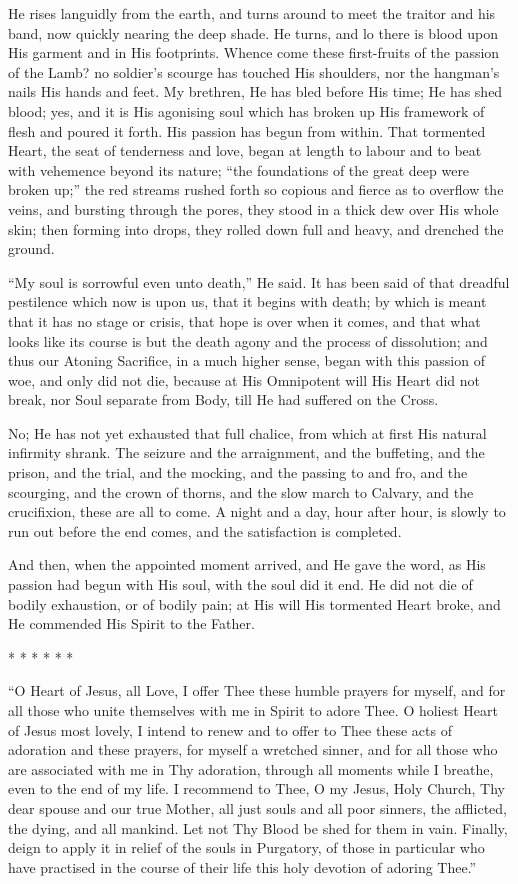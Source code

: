 He rises languidly from the earth, and turns around to meet the
traitor and his band, now quickly nearing the deep shade. He turns,
and lo there is blood upon His garment and in His footprints. Whence
come these first-fruits of the passion of the Lamb? no soldier's
scourge has touched His shoulders, nor the hangman's nails His hands
and feet. My brethren, He has bled before His time; He has shed blood;
yes, and it is His agonising soul which has broken up His framework of
flesh and poured it forth. His passion has begun from within. That
tormented Heart, the seat of tenderness and love, began at length to
labour and to beat with vehemence beyond its nature; ``the
foundations of the great deep were broken up;'' the red streams
rushed forth so copious and fierce as to overflow the veins, and
bursting through the pores, they stood in a thick dew over His whole
skin; then forming into drops, they rolled down full and heavy, and
drenched the ground.

``My soul is sorrowful even unto death,'' He said. It has
been said of that dreadful pestilence which now is upon us, that it
begins with death; by which is meant that it has no stage or crisis,
that hope is over when it comes, and that what looks like its course
is but the death agony and the process of dissolution; and thus our
Atoning Sacrifice, in a much higher sense, began with this passion of
woe, and only did not die, because at His Omnipotent will His Heart
did not break, nor Soul separate from Body, till He had suffered on
the Cross.

No; He has not yet exhausted that full chalice, from which at first
His natural infirmity shrank. The seizure and the arraignment, and the
buffeting, and the prison, and the trial, and the mocking, and the
passing to and fro, and the scourging, and the crown of thorns, and
the slow march to Calvary, and the crucifixion, these are all to come.
A night and a day, hour after hour, is slowly to run out before the
end comes, and the satisfaction is completed.

And then, when the appointed moment arrived, and He gave the word,
as His passion had begun with His soul, with the soul did it end. He
did not die of bodily exhaustion, or of bodily pain; at His will His
tormented Heart broke, and He commended His Spirit to the Father.

* *
* *
* *

``O Heart of Jesus, all Love, I offer Thee these humble prayers
for myself, and for all those who unite themselves with me in Spirit
to adore Thee. O holiest Heart of Jesus most lovely, I intend to renew
and to offer to Thee these acts of adoration and these prayers, for
myself a wretched sinner, and for all those who are associated with me
in Thy adoration, through all moments while I breathe, even to the end
of my life. I recommend to Thee, O my Jesus, Holy Church, Thy dear
spouse and our true Mother, all just souls and all poor sinners, the
afflicted, the dying, and all mankind. Let not Thy Blood be shed for
them in vain. Finally, deign to apply it in relief of the souls in
Purgatory, of those in particular who have practised in the course of
their life this holy devotion of adoring Thee.''


